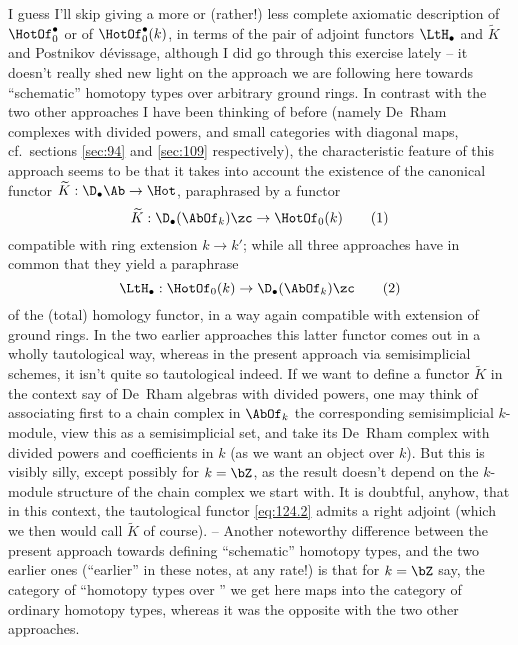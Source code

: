 \label{sec:124}%
I guess I'll skip giving a more or (rather!) less complete
axiomatic description of $\HotOf_0^\bullet$ or of
$\HotOf_0^\bullet(k)$, in terms of the pair of adjoint functors
$\LtH_\bullet$ and $\widetilde K$ and Postnikov dévissage, although I
did go through this exercise lately -- it doesn't really shed new
light on the approach we are following here towards ``schematic''
homotopy types over arbitrary ground rings. In contrast with the two
other approaches I have been thinking of before (namely De~Rham
complexes with divided powers, and small categories with diagonal
maps, cf.\ sections \ref{sec:94} and \ref{sec:109} respectively), the
characteristic feature of this approach seems to be that it takes into
account the existence of the canonical functor
$\widetilde K: \D_\bullet\Ab\to\Hot$, paraphrased by a functor
\begin{equation}
  \label{eq:124.1}
  \widetilde K:\D_\bullet(\AbOf_k)\zc\to\HotOf_0(k) \tag{1}
\end{equation}
compatible with ring extension $k\to k'$; while all three approaches
have in common that they yield a paraphrase
\begin{equation}
  \label{eq:124.2}
  \LtH_\bullet:\HotOf_0(k)\to\D_\bullet(\AbOf_k)\zc\tag{2}
\end{equation}
of the (total) homology functor, in a way again compatible with
extension of ground rings. In the two earlier approaches this latter
functor comes out in a wholly tautological way, whereas in the present
approach via semisimplicial schemes, it isn't quite so tautological
indeed. If we want to define a functor $\widetilde K$ in the context
say of De~Rham algebras with divided powers, one may think of
associating first to a chain complex in $\AbOf_k$ the corresponding
semisimplicial $k$-module, view this as a semisimplicial set, and take
its De~Rham complex with divided powers and coefficients in $k$ (as we
want an object over $k$). But this is visibly silly, except possibly
for $k=\bZ$, as the result doesn't depend on the $k$-module structure
of the chain complex we start with. It is doubtful, anyhow, that in
this context, the tautological functor \eqref{eq:124.2} admits a right
adjoint (which we then would call $\widetilde K$ of course). --\enspace
Another noteworthy difference between the present approach towards
defining ``schematic'' homotopy types, and the two earlier ones
(``earlier'' in these notes, at any rate!) is that for $k=\bZ$ say,
the category of ``homotopy types over \bZ'' we get here maps into the
category of ordinary homotopy types, whereas it was the opposite with
the two other approaches.


